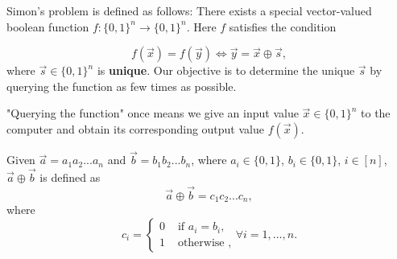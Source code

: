 \begin{definition}\label{Simon's Problem}
Simon's \cite{simon1997power} problem is defined as follows: There exists a special vector-valued boolean function $f:\{0,1\}^n \rightarrow\{0,1\}^n$. Here $f$ satisfies the condition

\begin{equation}
    f(\vec{x})=f(\vec{y}) \iff \vec{y}=\vec{x}\oplus \vec{s},
\end{equation} 
where $\vec{s}\in\{0,1\}^n$ is \textbf{unique}. Our objective is to determine the unique $\vec{s}$ by querying the function as few times as possible.
\end{definition}

\begin{remark}
"Querying the function" once means we give an input value $\vec{x} \in \{0,1\}^n$ to the computer and obtain its corresponding output value $f(\vec{x})$.
\end{remark}

\begin{mdframed}
	Given $\vec{a}=a_1a_2...a_n$ and $\vec{b}=b_1b_2...b_n$, where $a_i\in\{0,1\}$, $b_i\in\{0,1\}$, $i\in[n]$, $\vec{a}\oplus \vec{b}$ is defined as   
	\begin{equation}
    \vec{a}\oplus \vec{b}=c_1c_2...c_n,
\end{equation}
	where
	\begin{equation}
    c_i=\left\{\begin{array}{ll}
		0 & \text { if } a_i = b_i, \\
		1 & \text { otherwise },
	\end{array} \forall i=1, \ldots, n.\right.
\end{equation}
\end{mdframed}

%

